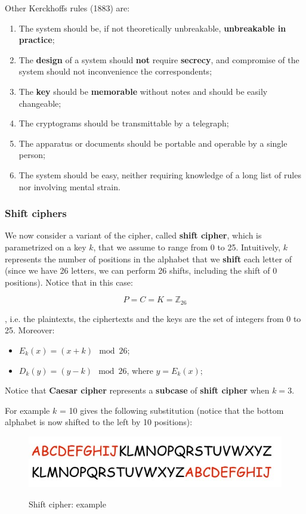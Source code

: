 Other Kerckhoffs rules (1883) are:

\begin{enumerate}
    \item The system should be, if not theoretically unbreakable, \textbf{unbreakable in practice};
    \item The \textbf{design} of a system should \textbf{not} require \textbf{secrecy}, and compromise of the system should not inconvenience the correspondents;
    \item The \textbf{key} should be \textbf{memorable} without notes and should be easily changeable;
    \item The cryptograms should be transmittable by a telegraph;
    \item The apparatus or documents should be portable and operable by a single person;
    \item The system should be easy, neither requiring knowledge of a long list of rules nor involving mental strain.
\end{enumerate}

\subsubsection{Shift ciphers}
We now consider a variant of the cipher, called \textbf{shift cipher}, which is parametrized on a key $k$, that we assume to range from 0 to 25. Intuitively, $k$ represents the number of positions in the alphabet that we \textbf{shift} each letter of (since we have 26 letters, we can perform 26 shifts, including the shift of 0 positions). Notice that in this case:

$$
P = C = K = \mathbb{Z}_{26}
$$

, i.e. the plaintexts, the ciphertexts and the keys are the set of integers from 0 to 25. Moreover:

\begin{itemize}
    \item $E_k(x) = (x+k) \mod 26$;
    \item $D_k(y) = (y-k) \mod 26$, where $y = E_k(x)$;
\end{itemize}

Notice that \textbf{Caesar cipher} represents a \textbf{subcase} of \textbf{shift cipher} when $k = 3$.

For example $k$ = 10 gives the following substitution (notice that the bottom alphabet is now shifted to the left by 10 positions):

\begin{figure}[h!]
        \centering
        \includegraphics[scale = 1.2]{img/cl6.jpg}
        \label{cl6}
        \caption{Shift cipher: example}
\end{figure}

